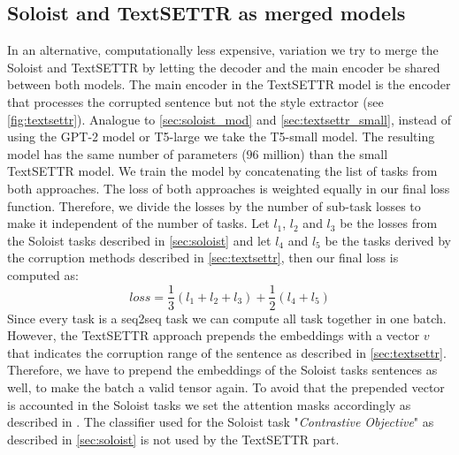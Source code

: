 \documentclass[twocolumn]{tum-article}
\begin{document}
\subsection{Soloist and TextSETTR as merged models}
In an alternative, computationally less expensive, variation we try to merge the Soloist and TextSETTR by letting the decoder and the main encoder be shared between both models. The main encoder in the TextSETTR model is the encoder that processes the corrupted sentence but not the style extractor (see \autoref{fig:textsettr}). Analogue to \autoref{sec:soloist_mod} and \autoref{sec:textsettr_small}, instead of using the GPT-2 model or T5-large we take the T5-small model. The resulting model has the same number of parameters ($96$ million) than the small TextSETTR model. We train the model by concatenating the list of tasks from both approaches. The loss of both approaches is weighted equally in our final loss function. Therefore, we divide the losses by the number of sub-task losses to make it independent of the number of tasks. Let $l_1$, $l_2$ and $l_3$ be the losses from the Soloist tasks described in \autoref{sec:soloist} and let $l_4$ and $l_5$ be the tasks derived by the corruption methods described in \autoref{sec:textsettr}, then our final loss is computed as:
$$
loss = \frac{1}{3}(l_1 + l_2 + l_3) + \frac{1}{2} (l_4 + l_5)
$$
Since every task is a seq2seq task we can compute all task together in one batch. However, the TextSETTR approach prepends the embeddings with a vector $v$ that indicates the corruption range of the sentence as described in \autoref{sec:textsettr}. Therefore, we have to prepend the embeddings of the Soloist tasks sentences as well, to make the batch a valid tensor again. To avoid that the prepended vector is accounted in the Soloist tasks we set the attention masks accordingly as described in \cite{vaswani2017attention}. The classifier used for the Soloist task "\textit{Contrastive Objective}" as described in \autoref{sec:soloist} is not used by the TextSETTR part.
\end{document}
